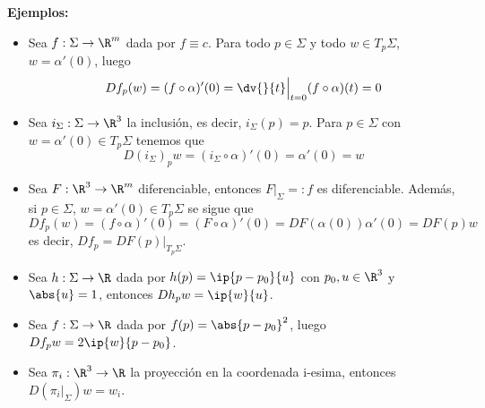\documentclass{article}
\begin{document}
\noindent\textbf{Ejemplos:}
\begin{itemize}
    \item Sea $f:\Sigma\to\R^{m}$ dada por $f\equiv c$. Para todo $p\in\Sigma$ y todo 
    $w\in T_{p}\Sigma$, $w=\alpha'(0)$, luego
    \begin{equation*}
        Df_{p}(w)=(f\circ\alpha)'(0)=\dv{}{t}\Big|_{t=0}(f\circ\alpha)(t)=0
    \end{equation*}

    \item Sea $i_{\Sigma}:\Sigma\to\R^{3}$ la inclusión, es decir, $i_{\Sigma}(p)=p$. Para 
    $p\in\Sigma$ con $w=\alpha'(0)\in T_{p}\Sigma$ tenemos que
    \begin{equation*}
        D(i_{\Sigma})_{p}w=(i_{\Sigma}\circ\alpha)'(0)=\alpha'(0)=w
    \end{equation*}

    \item Sea $F:\R^{3}\to\R^{m}$ diferenciable, entonces $F\big|_{\Sigma}=:f$ es diferenciable.
    Además, si $p\in\Sigma$, $w=\alpha'(0)\in T_{p}\Sigma$ se sigue que
    \begin{equation*}
        Df_{p}(w)=(f\circ\alpha)'(0)=(F\circ\alpha)'(0)=DF(\alpha(0))\alpha'(0)=DF(p)w
    \end{equation*}
    es decir, $Df_{p}=DF(p)\big|_{T_{p}\Sigma}$.

    \item Sea $h:\Sigma\to\R$ dada por $h(p)=\ip{p-p_{0}}{u}$ con $p_{0},u\in\R^{3}$ y $\abs{u}=1$,
    entonces $Dh_{p}w=\ip{w}{u}$.

    \item Sea $f:\Sigma\to\R$ dada por $f(p)=\abs{p-p_{0}}^{2}$, luego
    $Df_{p}w=2\ip{w}{p-p_{0}}$.

    \item Sea $\pi_{i}:\R^{3}\to\R$ la proyección en la coordenada i-esima, entonces
    $D\left(\pi_{i}\big|_{\Sigma}\right)w=w_{i}$.
\end{itemize}
 
\end{document}
